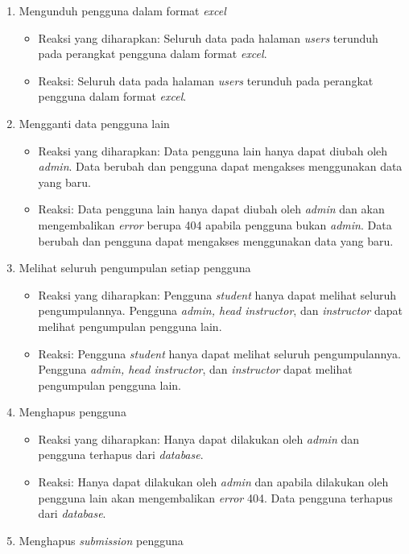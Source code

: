 \begin{enumerate}
	 \item Mengunduh pengguna dalam format \textit{excel}
	 \begin{itemize}
	 	\item Reaksi yang diharapkan: Seluruh data pada halaman \textit{users} terunduh pada perangkat pengguna dalam format \textit{excel}.
	 	\item Reaksi: Seluruh data pada halaman \textit{users} terunduh pada perangkat pengguna dalam format \textit{excel}.
	 \end{itemize}
	 \item Mengganti data pengguna lain
	 \begin{itemize}
	 	\item Reaksi yang diharapkan: Data pengguna lain hanya dapat diubah oleh \textit{admin}. Data berubah dan pengguna dapat mengakses menggunakan data yang baru.
	 	\item Reaksi: Data pengguna lain hanya dapat diubah oleh \textit{admin} dan akan mengembalikan \textit{error} berupa 404 apabila pengguna bukan \textit{admin}. Data berubah dan pengguna dapat mengakses menggunakan data yang baru.
	 \end{itemize}
	 \item Melihat seluruh pengumpulan setiap pengguna
	 \begin{itemize}
	 	\item Reaksi yang diharapkan: Pengguna \textit{student} hanya dapat melihat seluruh pengumpulannya. Pengguna \textit{admin, head instructor}, dan \textit{instructor} dapat melihat pengumpulan pengguna lain.
	 	\item Reaksi: Pengguna \textit{student} hanya dapat melihat seluruh pengumpulannya. Pengguna \textit{admin, head instructor}, dan \textit{instructor} dapat melihat pengumpulan pengguna lain.
	 \end{itemize}
	 \item Menghapus pengguna
	 \begin{itemize}
	 	\item Reaksi yang diharapkan: Hanya dapat dilakukan oleh \textit{admin} dan pengguna terhapus dari \textit{database}.
	 	\item Reaksi: Hanya dapat dilakukan oleh \textit{admin} dan apabila dilakukan oleh pengguna lain akan mengembalikan \textit{error} 404. Data pengguna terhapus dari \textit{database}.
	 \end{itemize}
	 \item Menghapus \textit{submission} pengguna
	 \begin{itemize}

\end{itemize}
\end{enumerate}
